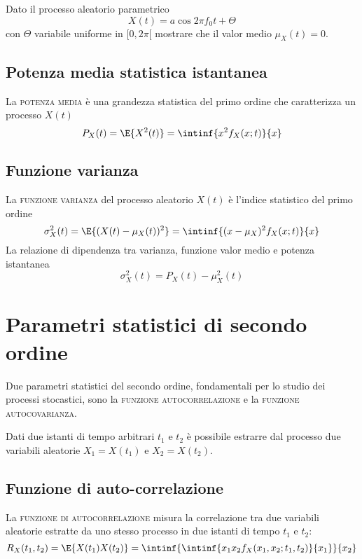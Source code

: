 \begin{esercizio}
Dato il processo aleatorio parametrico
\[
	X(t)=a\cos{2\pi f_0 t+\Theta}
\]
con $\Theta$ variabile uniforme in $[0,2\pi[$ mostrare che il valor medio $\mu_X(t)=0$.
\end{esercizio}

\subsection{Potenza media statistica istantanea}
La \textsc{potenza media} è una grandezza statistica del primo ordine che caratterizza un processo $X(t)$
\begin{equation}
	P_X(t)=\E{X^2(t)}=\intinf{x^2 f_X(x;t)}{x}
\end{equation}

\subsection{Funzione varianza}
La \textsc{funzione varianza} del processo aleatorio $X(t)$ è l'indice statistico del primo ordine
\begin{equation}
	\sigma^2_X(t)=\E{(X(t)-\mu_X(t))^2}=\intinf{(x-\mu_X)^2 f_X(x;t)}{x}
\end{equation}
La relazione di dipendenza tra varianza, funzione valor medio e potenza istantanea
\begin{equation}
	\sigma^2_X(t)=P_X(t)-\mu^2_X(t)
\end{equation}

\section{Parametri statistici di secondo ordine}
Due parametri statistici del secondo ordine, fondamentali per lo studio dei processi stocastici, sono la \textsc{funzione autocorrelazione} e la \textsc{funzione autocovarianza}.

Dati due istanti di tempo arbitrari $t_1$ e $t_2$ è possibile estrarre dal processo due variabili aleatorie $X_1=X(t_1)$ e $X_2=X(t_2)$.

\subsection{Funzione di auto-correlazione}
La \textsc{funzione di autocorrelazione} misura la correlazione tra due variabili aleatorie estratte da uno stesso processo in due istanti di tempo $t_1$ e $t_2$:
\begin{equation}
\label{eq:proc_autocorrelazione}
	R_X(t_1,t_2)=\E{X(t_1)X(t_2)}=\intinf{\intinf{x_1 x_2 f_X(x_1,x_2;t_1,t_2)}{x_1}}{x_2}
\end{equation}

